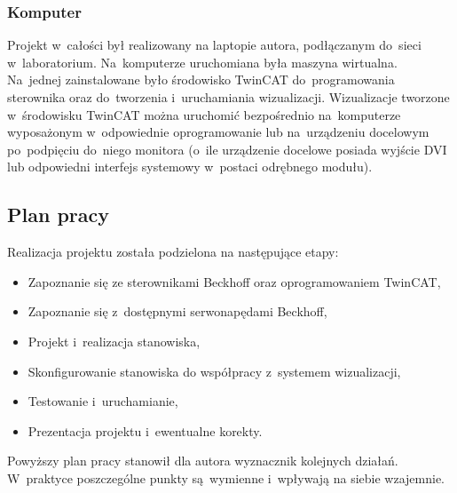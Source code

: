 \subsubsection{Komputer}
Projekt w~całości był realizowany na laptopie autora, podłączanym do~sieci w~laboratorium. Na~komputerze uruchomiana była maszyna wirtualna. Na~jednej zainstalowane było środowisko TwinCAT do~programowania sterownika oraz do~tworzenia i~uruchamiania wizualizacji. Wizualizacje tworzone w~środowisku TwinCAT można uruchomić bezpośrednio na~komputerze wyposażonym w~odpowiednie oprogramowanie lub na~urządzeniu docelowym po~podpięciu do~niego monitora (o~ile urządzenie docelowe posiada wyjście DVI lub odpowiedni interfejs systemowy w~postaci odrębnego modułu).

\subsection{Plan pracy}
Realizacja projektu została podzielona na następujące etapy:
\begin{itemize}
\item Zapoznanie się ze sterownikami Beckhoff oraz oprogramowaniem TwinCAT,
\item Zapoznanie się z~dostępnymi serwonapędami Beckhoff,
\item Projekt i~realizacja stanowiska,
\item Skonfigurowanie stanowiska do współpracy z~systemem wizualizacji,
\item Testowanie i~uruchamianie,
\item Prezentacja projektu i~ewentualne korekty.
\end{itemize}
\indent
\indent Powyższy plan pracy stanowił dla autora wyznacznik kolejnych działań. W~praktyce poszczególne punkty są~wymienne i~wpływają na siebie wzajemnie.